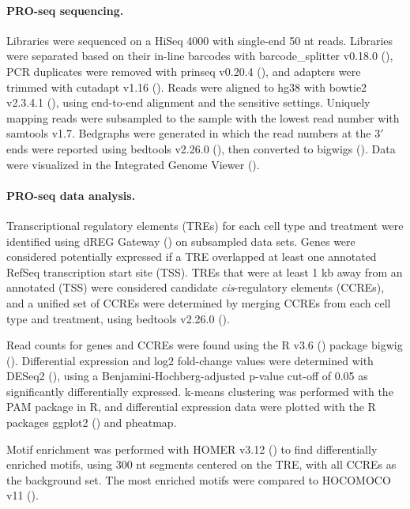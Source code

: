 \documentclass{article}
\begin{document}
{\paragraph{PRO-seq sequencing.} Libraries were sequenced on a HiSeq 4000 with single-end 50 nt reads. Libraries were separated based on their in-line barcodes with barcode\_splitter v0.18.0 (\cite{leach_barcode_2019}), PCR duplicates were removed with prinseq v0.20.4 (\cite{schmieder_quality_2011}), and adapters were trimmed with cutadapt v1.16 (\cite{martin_cutadapt_2011}). Reads were aligned to hg38 with bowtie2 v2.3.4.1 (\cite{langmead_fast_2012}), using end-to-end alignment and the sensitive settings. Uniquely mapping reads were subsampled to the sample with the lowest read number with samtools v1.7. Bedgraphs were generated in which the read numbers at the 3$\prime$ ends were reported using bedtools v2.26.0 (\cite{quinlan_bedtools:_2010}), then converted to bigwigs (\cite{kent_bigwig_2010}). Data were visualized in the Integrated Genome Viewer (\cite{robinson_integrative_2011}).

 \paragraph{PRO-seq data analysis.} Transcriptional regulatory elements (TREs) for each cell type and treatment were identified using dREG Gateway (\cite{danko_identification_2015, wang_identification_2019, chu_discovering_2019}) on subsampled data sets. Genes were considered potentially expressed if a TRE overlapped at least one annotated RefSeq transcription start site (TSS). TREs that were at least 1 kb away from an annotated (TSS) were considered candidate \emph{cis}-regulatory elements (CCREs), and a unified set of CCREs were determined by merging CCREs from each cell type and treatment, using bedtools v2.26.0 (\cite{quinlan_bedtools:_2010}).
 
 Read counts for genes and CCREs were found using the R v3.6 (\cite{r_core_team_r_2019}) package bigwig (\cite{martins_bigwig_2014}). Differential expression and log2 fold-change values were determined with DESeq2 (\cite{love_moderated_2014}), using a Benjamini-Hochberg-adjusted p-value cut-off of 0.05 as significantly differentially expressed. k-means clustering was performed with the PAM package in R, and differential expression data were plotted with the R packages ggplot2 (\cite{wickham_ggplot2_2016}) and pheatmap.
 
Motif enrichment was performed with HOMER v3.12 (\cite{heinz_simple_2010}) to find differentially enriched motifs, using 300 nt segments centered on the TRE, with all CCREs as the background set. The most enriched motifs were compared to HOCOMOCO v11 (\cite{kulakovskiy_hocomoco_2018}).

}
\end{document}
